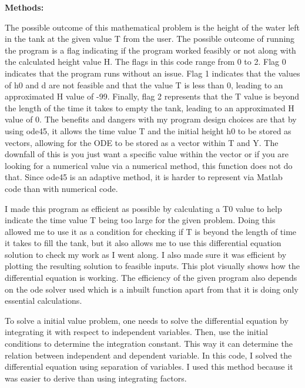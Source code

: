 \documentclass{article}
\begin{document}
{\bf Methods:} {\color{black} The possible outcome of this mathematical problem is the height of the water left in the tank at the given value T from the user.  The possible outcome of running the program is a flag indicating if the program worked feasibly or not along with the calculated height value H.  The flags in this code range from 0 to 2.  Flag 0 indicates that the program runs without an issue.  Flag 1 indicates that the values of h0 and d are not feasible and that the value T is less than 0, leading to an approximated H value of -99.  Finally, flag 2 represents that the T value is beyond the length of the time it takes to empty the tank, leading to an approximated H value of 0.  The benefits and dangers with my program design choices are that by using ode45, it allows the time value T and the initial height h0 to be stored as vectors, allowing for the ODE to be stored as a vector within T and Y.  The downfall of this is you just want a specific value within the vector or if you are looking for a numerical value via a numerical method, this function does not do that.  Since ode45 is an adaptive method, it is harder to represent via Matlab code than with numerical code.  
\par \medskip \par
I made this program as efficient as possible by calculating a T0 value to help indicate the time value T being too large for the given problem.  Doing this allowed me to use it as a condition for checking if T is beyond the length of time it takes to fill the tank, but it also allows me to use this differential equation solution to check my work as I went along.  I also made sure it was efficient by plotting the resulting solution to feasible inputs.  This plot visually shows how the differential equation is working.  The efficiency of the given program also depends on the ode solver used which is a inbuilt function apart from that it is doing only essential calculations.  
\par \medskip \par
To solve a initial value problem, one needs to solve the differential equation by integrating it with respect to independent variables. Then, use the initial conditions to determine the integration constant. This way it can determine the relation between independent and dependent variable.  In this code, I solved the differential equation using separation of variables.  I used this method because it was easier to derive than using integrating factors.

}
\par \bigskip \par
\end{document}
